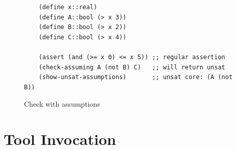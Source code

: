 \documentclass[11pt,twoside,fleqn,openright,titlepage]{cslreport}
\begin{document}
\begin{figure}[h]
\begin{footnotesize}
\begin{verbatim}
    (define x::real)
    (define A::bool (> x 3))
    (define B::bool (> x 2))
    (define C::bool (> x 4))

    (assert (and (>= x 0) <= x 5)) ;; regular assertion
    (check-assuming A (not B) C)   ;; will return unsat
    (show-unsat-assumptions)       ;; unsat core: (A (not B))
\end{verbatim}
\end{footnotesize}
\caption{Check with assumptions}
\label{example:check-assuming}
\end{figure}





\section{Tool Invocation}
\end{document}
